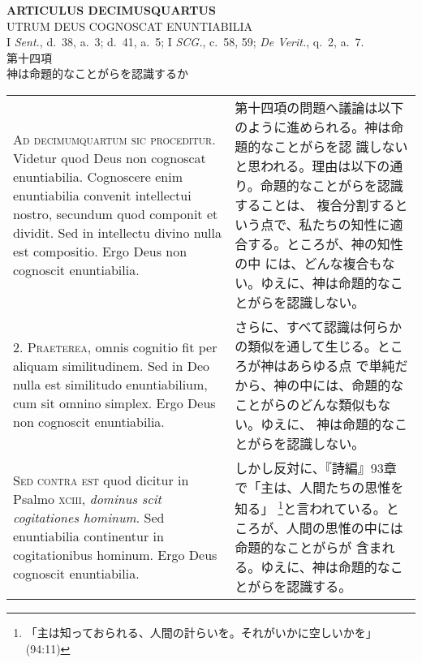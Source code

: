 \documentclass[10pt]{jsarticle} %
\begin{document}
\begin{center}
 {\Large {\bf ARTICULUS DECIMUSQUARTUS}}\\
 {\large UTRUM DEUS COGNOSCAT ENUNTIABILIA}\\
 {\footnotesize I {\itshape Sent.}, d.~38, a.~3; d.~41, a.~5; I {\itshape SCG.}, c.~58, 59; {\itshape De Verit.}, q.~2, a.~7.}\\
 {\Large 第十四項\\神は命題的なことがらを認識するか}
\end{center}

\begin{longtable}{p{21em}p{21em}}



{\huge A}{\scshape d decimumquartum sic proceditur}. Videtur
quod Deus non cognoscat enuntiabilia. Cognoscere enim enuntiabilia
convenit intellectui nostro, secundum quod componit et dividit. Sed in
intellectu divino nulla est compositio. Ergo Deus non cognoscit
enuntiabilia.


&

第十四項の問題へ議論は以下のように進められる。神は命題的なことがらを認
識しないと思われる。理由は以下の通り。命題的なことがらを認識することは、
複合分割するという点で、私たちの知性に適合する。ところが、神の知性の中
には、どんな複合もない。ゆえに、神は命題的なことがらを認識しない。

\\


{\scshape 2. Praeterea}, omnis cognitio fit per aliquam
similitudinem. Sed in Deo nulla est similitudo enuntiabilium, cum sit
omnino simplex. Ergo Deus non cognoscit enuntiabilia.


&

さらに、すべて認識は何らかの類似を通して生じる。ところが神はあらゆる点
で単純だから、神の中には、命題的なことがらのどんな類似もない。ゆえに、
神は命題的なことがらを認識しない。

\\


{\scshape Sed contra est} quod dicitur in Psalmo {\scshape xciii},
{\itshape dominus scit cogitationes hominum}. Sed enuntiabilia
continentur in cogitationibus hominum. Ergo Deus cognoscit enuntiabilia.


&

しかし反対に、『詩編』93章で「主は、人間たちの思惟を知る」
\footnote{「主は知っておられる、人間の計らいを。それがいかに空しいかを」
(94:11)}と言われている。ところが、人間の思惟の中には命題的なことがらが
含まれる。ゆえに、神は命題的なことがらを認識する。


\end{longtable}
\end{document}
